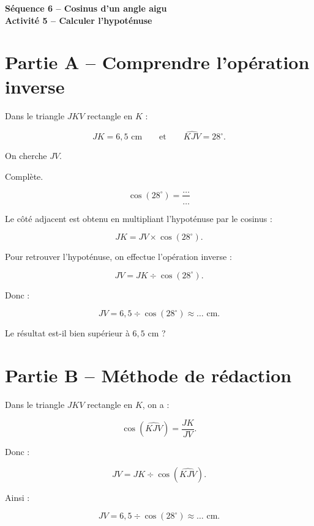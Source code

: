 \documentclass[12pt,a4paper]{article}
\newcommand{\titreseq}[1]{%
\begin{center}
{\sffamily\LARGE\bfseries\color{TitreC}Séquence 6 -- Cosinus d'un angle aigu}\\[0.2em]
{\sffamily\large\bfseries\color{SavoirC}#1}
\end{center}}
\begin{document}
\titreseq{Activité 5 -- Calculer l'hypoténuse}

\section*{Partie A -- Comprendre l'opération inverse}

Dans le triangle \(JKV\) rectangle en \(K\) :

\[
JK=6{,}5\text{ cm}
\qquad\text{et}\qquad
\widehat{KJV}=28^\circ.
\]

On cherche \(JV\).

\begin{center}
\end{center}

Complète.

\[
\cos(28^\circ)=\frac{\ldots}{\ldots}
\]

Le côté adjacent est obtenu en multipliant l'hypoténuse par le cosinus :

\[
JK=JV\times\cos(28^\circ).
\]

Pour retrouver l'hypoténuse, on effectue l'opération inverse :

\[
JV=JK\div\cos(28^\circ).
\]

Donc :

\[
JV=6{,}5\div\cos(28^\circ)\approx\ldots\text{ cm}.
\]

Le résultat est-il bien supérieur à \(6{,}5\) cm ?

\section*{Partie B -- Méthode de rédaction}

\begin{tcolorbox}[colback=white,colframe=SavoirC,boxrule=0.7pt,arc=2mm]
Dans le triangle \(JKV\) rectangle en \(K\), on a :

\[
\cos(\widehat{KJV})=\frac{JK}{JV}.
\]

Donc :

\[
JV=JK\div\cos(\widehat{KJV}).
\]

Ainsi :

\[
JV=6{,}5\div\cos(28^\circ)
\approx\ldots\text{ cm}.
\]
\end{tcolorbox}
\end{document}
